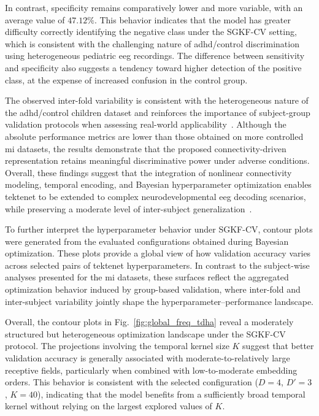 In contrast, specificity remains comparatively lower and more variable, with an average value of $47.12\%$. This behavior indicates that the model has greater difficulty correctly identifying the negative class under the SGKF-CV setting, which is consistent with the challenging nature of \gls{adhd}/control discrimination using heterogeneous pediatric \gls{eeg} recordings. The difference between sensitivity and specificity also suggests a tendency toward higher detection of the positive class, at the expense of increased confusion in the control group.

The observed inter-fold variability is consistent with the heterogeneous nature of the \gls{adhd}/control children dataset and reinforces the importance of subject-group validation protocols when assessing real-world applicability~\cite{saha2020intra}. Although the absolute performance metrics are lower than those obtained on more controlled \gls{mi} datasets, the results demonstrate that the proposed connectivity-driven representation retains meaningful discriminative power under adverse conditions. Overall, these findings suggest that the integration of nonlinear connectivity modeling, temporal encoding, and Bayesian hyperparameter optimization enables \gls{tektenet} to be extended to complex neurodevelopmental \gls{eeg} decoding scenarios, while preserving a moderate level of inter-subject generalization~\cite{schreiber2000measuring}.

{To further interpret the hyperparameter behavior under SGKF-CV, contour plots were generated from the evaluated configurations obtained during Bayesian optimization. These plots provide a global view of how validation accuracy varies across selected pairs of \gls{tektenet} hyperparameters. In contrast to the subject-wise analyses presented for the \gls{mi} datasets, these surfaces reflect the aggregated optimization behavior induced by group-based validation, where inter-fold and inter-subject variability jointly shape the hyperparameter--performance landscape.}

{Overall, the contour plots in Fig.~\ref{fig:global_freq_tdha} reveal a moderately structured but heterogeneous optimization landscape under the SGKF-CV protocol. The projections involving the temporal kernel size $K$ suggest that better validation accuracy is generally associated with moderate-to-relatively large receptive fields, particularly when combined with low-to-moderate embedding orders. This behavior is consistent with the selected configuration ($D=4$, $D'=3$, $K=40$), indicating that the model benefits from a sufficiently broad temporal kernel without relying on the largest explored values of $K$.}

